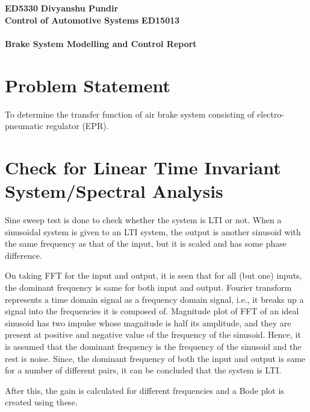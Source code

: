 \documentclass{article}
\begin{document}
\noindent\large\textbf{ED5330} \hfill \textbf{Divyanshu Pundir} \\
\large\textbf{Control of Automotive Systems} \hfill \textbf{ED15013} \\
\\
\large\textbf{Brake System Modelling and Control Report}\\


\section*{Problem Statement}
To determine the transfer function of air brake system consisting of electro-pneumatic regulator (EPR).

\section{Check for Linear Time Invariant System/Spectral Analysis}
Sine sweep test is done to check whether the system is LTI or not.
When a sinusoidal system is given to an LTI system, the output is another sinusoid with the same frequency as that of the input, but it is scaled and has some phase difference.

On taking FFT for the input and output, it is seen that for all (but one) inputs, the dominant frequency is same for both input and output.
Fourier transform represents a time domain signal as a frequency domain signal, i.e., it breaks up a signal into the frequencies it is composed of.
Magnitude plot of FFT of an ideal sinusoid has two impulse whose magnitude is half its amplitude, and they are present at positive and negative value of the frequency of the sinusoid.
Hence, it is assumed that the dominant frequency is the frequency of the sinusoid and the rest is noise. Since, the dominant frequency of both the input and output is same for a number of different pairs, it can be concluded that the system is LTI.

After this, the gain is calculated for different frequencies and a Bode plot is created using these.
\end{document}
